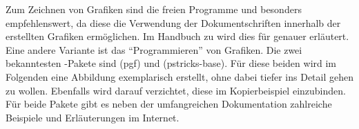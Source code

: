 \documentclass[%
  english,ngerman,%
  geometry=no,DIV=12,automark,%
]{tudscrartcl}
\begin{document}
Zum Zeichnen von Grafiken sind die freien Programme  und 
besonders  empfehlenswert, da diese die Verwendung der 
Dokumentschriften innerhalb der erstellten Grafiken ermöglichen. Im Handbuch zu 
\TUDScript wird dies für  
genauer erläutert. Eine andere Variante ist das \enquote{Programmieren} von 
Grafiken. Die zwei bekanntesten -Pakete sind (pgf) 
und (pstricks-base). Für diese beiden wird im Folgenden eine 
Abbildung exemplarisch erstellt, ohne dabei tiefer ins Detail gehen zu wollen. 
Ebenfalls wird darauf verzichtet, diese im Kopierbeispiel einzubinden. Für 
beide Pakete gibt es neben der umfangreichen Dokumentation zahlreiche Beispiele 
und Erläuterungen im Internet.
\end{document}
